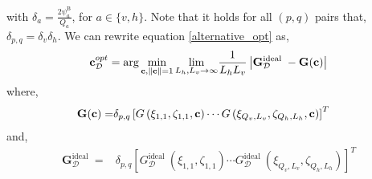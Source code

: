 \noindent with $\delta_a = \frac{2\psi_a^{\mathrm{B}}}{Q_a}$, for $a \in \{v, h\}$. Note that it holds for all $(p,q)$ pairs that, $\delta_{p,q} = \delta_v\delta_h$. 
We can rewrite equation \eqref{alternative_opt} as, 
\begin{align}
    {\bf{c}}_{\mathcal{D}}^{opt}=\arg \min _{{\bf{c}}, \|{\bf{c}}\|=1} \underset{L_h, L_v \rightarrow \infty}{\lim}\frac{1}{L_hL_v}\left|\mathbf{G}^{\text {ideal }}_{\mathcal{D}}-\mathbf{G}({\bf{c}})\right|\label{init_normed_opt}
\end{align}
where, 
\begin{align}
    \mathbf{G}({\bf{c}}) =&  \delta_{p,q}\left[G\left(\xi_{1,1}, \zeta_{1,1}, {\bf{c}}\right) \cdots G\left(\xi_{Q_{v}, L_{v}}, \zeta_{Q_{h}, L_{h}}, {\bf{c}}\right)\right]^{T}  
\end{align}
and,
\begin{align}
    \mathbf{G}^{\text {ideal }}_{ \mathcal{D}} =& \delta_{p,q}\left[G^{\text {ideal }}_{ \mathcal{D}}\left(\xi_{1,1}, \zeta_{1,1} \right) \cdots  G^{\text {ideal }}_{ \mathcal{D}}\left(\xi_{Q_{v}, L_v}, \zeta_{ Q_{h}, L_{h}}\right)\right]^{T} 
\end{align}




